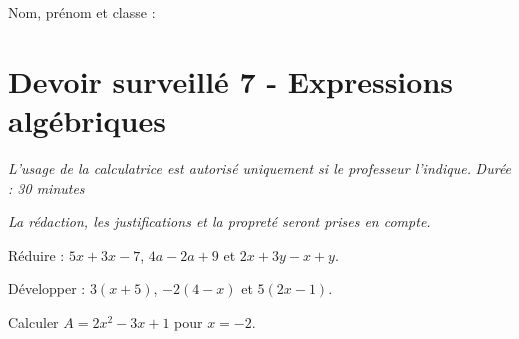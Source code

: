 \documentclass[a4paper,10pt]{report}
\begin{document}
\pagestyle{empty}
\noindent Nom, prénom et classe : \dotfill

\section*{Devoir surveillé 7 - Expressions algébriques}

\noindent \textit{L'usage de la calculatrice est autorisé uniquement si le professeur l'indique.} \hfill \textit{Durée : 30 minutes}

\medskip
\noindent \textit{La rédaction, les justifications et la propreté seront prises en compte.}


\begin{ex}[Réduire]
Réduire : $5x+3x-7$, $4a-2a+9$ et $2x+3y-x+y$.
\medskip\noindent\grandscarreaux{\linewidth}{3cm}
\end{ex}
\begin{ex}[Développer]
Développer : $3(x+5)$, $-2(4-x)$ et $5(2x-1)$.
\medskip\noindent\grandscarreaux{\linewidth}{4cm}
\end{ex}
\begin{ex}[Substituer]
Calculer $A=2x^2-3x+1$ pour $x=-2$.
\medskip\noindent\grandscarreaux{\linewidth}{3cm}
\end{ex}
\end{document}
